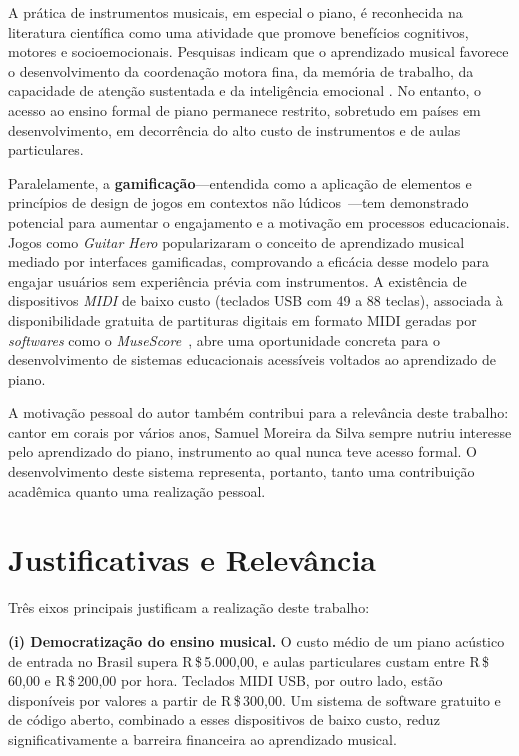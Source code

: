 \documentclass[
  12pt,
  openright,
  twoside,
  a4paper,
  english,
  brazil
]{abntex2}
\begin{document}
A prática de instrumentos musicais, em especial o piano, é reconhecida na
literatura científica como uma atividade que promove benefícios cognitivos,
motores e socioemocionais. Pesquisas indicam que o aprendizado musical
favorece o desenvolvimento da coordenação motora fina, da memória de
trabalho, da capacidade de atenção sustentada e da inteligência emocional
\cite{hallam2015,miendlarzewska2014}. No entanto, o acesso ao ensino
formal de piano permanece restrito, sobretudo em países em
desenvolvimento, em decorrência do alto custo de instrumentos e de aulas
particulares.

Paralelamente, a \textbf{gamificação}---entendida como a aplicação de
elementos e princípios de design de jogos em contextos não
lúdicos~\cite{deterding2011}---tem demonstrado potencial para aumentar o
engajamento e a motivação em processos educacionais. Jogos como
\textit{Guitar Hero\textregistered} popularizaram o conceito de
aprendizado musical mediado por interfaces gamificadas, comprovando a
eficácia desse modelo para engajar usuários sem experiência prévia com
instrumentos. A existência de dispositivos \textit{MIDI} de baixo custo
(teclados USB com 49 a 88 teclas), associada à disponibilidade gratuita de
partituras digitais em formato MIDI geradas por \textit{softwares} como o
\textit{MuseScore}~\cite{musescore}, abre uma oportunidade concreta para o
desenvolvimento de sistemas educacionais acessíveis voltados ao
aprendizado de piano.

A motivação pessoal do autor também contribui para a relevância deste
trabalho: cantor em corais por vários anos, Samuel Moreira da Silva sempre
nutriu interesse pelo aprendizado do piano, instrumento ao qual nunca teve
acesso formal. O desenvolvimento deste sistema representa, portanto, tanto
uma contribuição acadêmica quanto uma realização pessoal.

\section{Justificativas e Relevância}

Três eixos principais justificam a realização deste trabalho:

\textbf{(i) Democratização do ensino musical.}
O custo médio de um piano acústico de entrada no Brasil supera
R\,\$\,5.000,00, e aulas particulares custam entre R\,\$\,60,00 e
R\,\$\,200,00 por hora. Teclados MIDI USB, por outro lado, estão
disponíveis por valores a partir de R\,\$\,300,00. Um sistema de software
gratuito e de código aberto, combinado a esses dispositivos de baixo
custo, reduz significativamente a barreira financeira ao aprendizado
musical.
\end{document}
